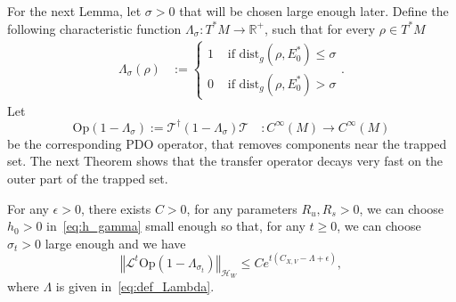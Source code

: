 \documentclass[AHL,Unicode,longabstracts,published]{cedram}
\newcommand{\clT}{\mathcal{T}}
\newcommand{\clH}{\mathcal{H}}
\newcommand{\clL}{\mathcal{L}}
\newcommand{\dist}{\mathrm{dist}}
\newcommand{\Opp}{\mathrm{Op}}
\newcommand{\bbR}{\mathbb{R}}
\newcommand{\clH}{\mathcal{H}}
\newcommand{\bbR}{\mathbb{R}}
\begin{document}
For the next Lemma, let $\sigma>0$ that will be chosen large enough later. Define the following characteristic function $\Lambda_{\sigma}:T^{*}M\rightarrow\bbR^{+}$, such that for every $\rho\in T^{*}M$
\begin{equation*}\label{eq:def_Lambda-1}
\begin{split}
\Lambda_{\sigma}\left(\rho\right) & :=
\begin{cases}
1 & \text{ if }\dist_{g}\left(\rho,E_{0}^{*}\right)\leq\sigma\\
0 & \text{ if }\dist_{g}\left(\rho,E_{0}^{*}\right)>\sigma
\end{cases}.
\end{split}
\end{equation*}
Let
\begin{equation}\label{eq:def_op_Lambda}
\Opp \left(1-\Lambda_{\sigma}\right):=\clT^{\dagger}\left(1-\Lambda_{\sigma}\right)\clT\quad:C^{\infty}\left(M\right)\rightarrow C^{\infty}\left(M\right)
\end{equation}
be the corresponding PDO operator, that removes components near the trapped set. The next Theorem shows that the transfer operator decays very fast on the outer part of the trapped set.

\begin{cBoxB}{}
\begin{theo}\label{thm:decay_outside_trapped_set}
For any $\epsilon>0$, there exists $C>0$, for any parameters $R_{u},R_{s}>0$, we can choose $h_{0}>0$ in~\eqref{eq:h_gamma} small enough so that, for any $t\geq0$, we can choose $\sigma_{t}>0$ large enough and we have
\begin{equation}\label{eq:bound_C_X,V-2}
\left\Vert \clL^{t}\Opp \left(1-\Lambda_{\sigma_{t}}\right)\right\Vert _{\clH _{W}}\leq Ce^{t\left(C_{X,V}-\Lambda+\epsilon\right)},
\end{equation}
where $\Lambda$ is given in~\eqref{eq:def_Lambda}.
\end{theo}
\end{cBoxB}
\end{document}
